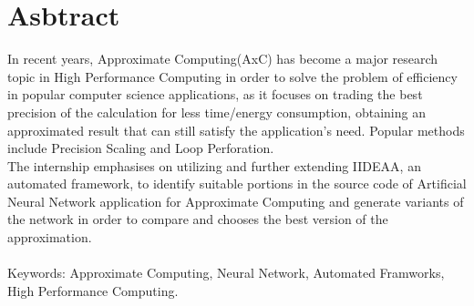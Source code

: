 \chapter*{Asbtract}
In recent years, Approximate Computing(AxC) has become a major research topic in High Performance Computing in order to solve the problem of efficiency in popular computer science applications, as it focuses on trading the best precision of the calculation for less time/energy consumption, obtaining an approximated result that can still satisfy the application's need. Popular methods include Precision Scaling and Loop Perforation. \\
The internship emphasises on utilizing and further extending IIDEAA, an automated framework, to identify suitable portions in the source code of Artificial Neural Network application for Approximate Computing and generate variants of the network in order to compare and chooses the best version of the approximation.\\
\\
Keywords: Approximate Computing, Neural Network, Automated Framworks, High Performance Computing.